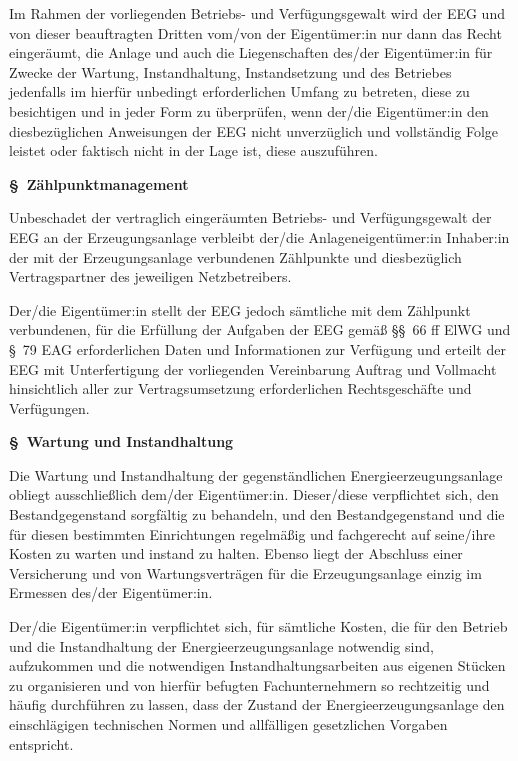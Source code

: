 \documentclass[a4paper,11pt]{article}
\newcounter{parasec}
\newcounter{parasubsec}[parasec]
\newcommand{\parasec}[1]{%
  \stepcounter{parasec}%
  \setcounter{parasubsec}{0}%
  \par\Needspace*{5\baselineskip}%
  \bigskip
  {\large\bfseries\color{tuerkis}\S\ \theparasec\quad #1}\par\nopagebreak
  \smallskip\nopagebreak
}
\begin{document}
Im Rahmen der vorliegenden Betriebs- und Verfügungsgewalt wird der EEG und von dieser beauftragten Dritten vom/von der Eigentümer:in nur dann das Recht eingeräumt, die Anlage und auch die Liegenschaften des/der Eigentümer:in für Zwecke der Wartung, Instandhaltung, Instandsetzung und des Betriebes jedenfalls im hierfür unbedingt erforderlichen Umfang zu betreten, diese zu besichtigen und in jeder Form zu überprüfen, wenn der/die Eigentümer:in den diesbezüglichen Anweisungen der EEG nicht unverzüglich und vollständig Folge leistet oder faktisch nicht in der Lage ist, diese auszuführen.

\parasec{Zählpunktmanagement}

Unbeschadet der vertraglich eingeräumten Betriebs- und Verfügungsgewalt der EEG an der Erzeugungsanlage verbleibt der/die Anlageneigentümer:in Inhaber:in der mit der Erzeugungsanlage verbundenen Zählpunkte und diesbezüglich Vertragspartner des jeweiligen Netzbetreibers.

Der/die Eigentümer:in stellt der EEG jedoch sämtliche mit dem Zählpunkt verbundenen, für die Erfüllung der Aufgaben der EEG gemäß \S\S\ 66 ff ElWG und \S\ 79 EAG erforderlichen Daten und Informationen zur Verfügung und erteilt der EEG mit Unterfertigung der vorliegenden Vereinbarung Auftrag und Vollmacht hinsichtlich aller zur Vertragsumsetzung erforderlichen Rechtsgeschäfte und Verfügungen.

\parasec{Wartung und Instandhaltung}

Die Wartung und Instandhaltung der gegenständlichen Energieerzeugungsanlage obliegt ausschließlich dem/der Eigentümer:in. Dieser/diese verpflichtet sich, den Bestandgegenstand sorgfältig zu behandeln, und den Bestandgegenstand und die für diesen bestimmten Einrichtungen regelmäßig und fachgerecht auf seine/ihre Kosten zu warten und instand zu halten. Ebenso liegt der Abschluss einer Versicherung und von Wartungsverträgen für die Erzeugungsanlage einzig im Ermessen des/der Eigentümer:in.

Der/die Eigentümer:in verpflichtet sich, für sämtliche Kosten, die für den Betrieb und die Instandhaltung der Energieerzeugungsanlage notwendig sind, aufzukommen und die notwendigen Instandhaltungsarbeiten aus eigenen Stücken zu organisieren und von hierfür befugten Fachunternehmern so rechtzeitig und häufig durchführen zu lassen, dass der Zustand der Energieerzeugungsanlage den einschlägigen technischen Normen und allfälligen gesetzlichen Vorgaben entspricht.
\end{document}
